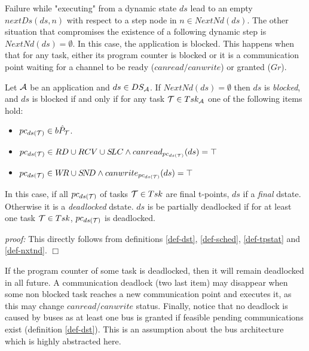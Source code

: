 \documentclass{article}
\begin{document}
Failure while "executing" from a dynamic state $ds$ lead to an empty $nextDs(ds,n)$ with respect to a step node in $n\in NextN\!d(ds)$. The other situation that compromises the existence of a following dynamic step is $NextN\!d(ds)=\emptyset$. In this case, the application is blocked. This happens when that for any task, either its program counter is blocked or it is a communication point waiting for a channel to be ready ($canread/canwrite$) or granted ($Gr$). 
\begin{fact}\label{fact-blocked} Let ${\cal A}$ be an application and $ds\in DS_{\cal A}$. If $NextN\!d(ds)=\emptyset$ then $ds$ is  {\em blocked}, and
$ds$ is blocked if and only if for any task ${\cal T}\in Tsk_{\cal A}$ one of the following items hold:
\begin{itemize}
\item $pc_{ds({\cal T})}\in b\hat P_{\cal T}$.
\item $pc_{ds({\cal T})}\in RD\cup RCV\cup S\!LC \wedge canread_{pc_{ds({\cal T})}}(ds)=\top $
\item $pc_{ds({\cal T})}\in W\!R\cup S\!N\!D \wedge canwrite_{pc_{ds({\cal T})}}(ds)=\top$
\end{itemize}
In this case, if all $pc_{ds({\cal T})}$ of tasks ${\cal T}\in Tsk$ are final t-points, $ds$ if a {\em final} dstate. Otherwise it is a {\em deadlocked} dstate. $ds$ is be partially deadlocked if for at least one task ${\cal T}\in Tsk$, $pc_{ds({\cal T})}$ is deadlocked. 
\end{fact}
{\em proof:} This directly follows from definitions \ref{def-dst}, \ref{def-sched}, \ref{def-tpstat} and \ref{def-nxtnd}. $\Box$

If the program counter of some task is deadlocked, then it will remain deadlocked in all future. A communication deadlock (two last item) may disappear when some non blocked task reaches a new communication point and executes it, as this may change $canread/canwrite$ status. Finally, notice that no deadlock is caused by buses as at least one bus is granted if feasible pending communications exist (definition \ref{def-dst}). This is an assumption about the bus architecture which is highly abstracted here. 
\end{document}

